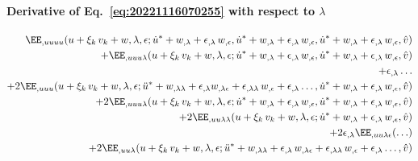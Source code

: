 \paragraph{Derivative of Eq.~\eqref{eq:20221116070255} with respect to \(\lambda\)}
\begin{equation}
  \begin{aligned}[b]
    \EE_{,uuuu}(u + \xi_k \, v_k + w, \lambda, \epsilon; \dot{u}^\ast + w_{,\lambda} + \epsilon_{,\lambda} \, w_{,\epsilon}, \dot{u}^\ast + w_{,\lambda} + \epsilon_{,\lambda} \, w_{,\epsilon}, \dot{u}^\ast + w_{,\lambda} + \epsilon_{,\lambda} \, w_{,\epsilon}, \hat{v}) &\\
    + \EE_{,uuu\lambda}(u + \xi_k \, v_k + w, \lambda, \epsilon; \dot{u}^\ast + w_{,\lambda} + \epsilon_{,\lambda} \, w_{,\epsilon}, \dot{u}^\ast + w_{,\lambda} + \epsilon_{,\lambda} \, w_{,\epsilon}, \hat{v}) &\\
    + \epsilon_{,\lambda} \ldots &\\
    + 2\EE_{,uuu}(u + \xi_k \, v_k + w, \lambda, \epsilon; \ddot{u}^\ast + w_{,\lambda\lambda} + \epsilon_{,\lambda} w_{,\lambda\epsilon} + \epsilon_{,\lambda\lambda} \, w_{,\epsilon} + \epsilon_{,\lambda} \ldots, \dot{u}^\ast + w_{,\lambda} + \epsilon_{,\lambda} \, w_{,\epsilon}, \hat{v}) &\\
    + 2\EE_{,uuu\lambda}(u + \xi_k \, v_k + w, \lambda, \epsilon; \dot{u}^\ast + w_{,\lambda} + \epsilon_{,\lambda} \, w_{,\epsilon}, \dot{u}^\ast + w_{,\lambda} + \epsilon_{,\lambda} \, w_{,\epsilon}, \hat{v}) &\\
    + 2\EE_{,uu\lambda\lambda}(u + \xi_k \, v_k + w, \lambda, \epsilon; \dot{u}^\ast + w_{,\lambda} + \epsilon_{,\lambda} \, w_{,\epsilon}, \hat{v}) &\\
    + 2\epsilon_{,\lambda} \EE_{,uu\lambda\epsilon}(\ldots) &\\
     + 2\EE_{,uu\lambda}(u + \xi_k \, v_k + w, \lambda, \epsilon; \ddot{u}^\ast + w_{,\lambda\lambda} + \epsilon_{,\lambda} \, w_{,\lambda\epsilon} + \epsilon_{,\lambda\lambda} \, w_{,\epsilon} + \epsilon_{,\lambda} \ldots, \hat{v}) &\\

\end{aligned}
\end{equation}
